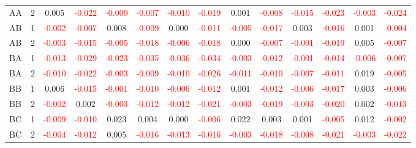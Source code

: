 \begin{table}[H]
{\begin{tabular}{llcccccccccccc}
AA & 2 & 0.005 & \textcolor{red}{-0.022} & \textcolor{red}{-0.009} & \textcolor{red}{-0.007} & \textcolor{red}{-0.010} & \textcolor{red}{-0.019} & 0.001 & \textcolor{red}{-0.008} & \textcolor{red}{-0.015} & \textcolor{red}{-0.023} & \textcolor{red}{-0.003} & \textcolor{red}{-0.024}\\
AB & 1 & \textcolor{red}{-0.002} & \textcolor{red}{-0.007} & 0.008 & \textcolor{red}{-0.009} & 0.000 & \textcolor{red}{-0.011} & \textcolor{red}{-0.005} & \textcolor{red}{-0.017} & 0.003 & \textcolor{red}{-0.016} & 0.001 & \textcolor{red}{-0.004}\\
AB & 2 & \textcolor{red}{-0.003} & \textcolor{red}{-0.015} & \textcolor{red}{-0.005} & \textcolor{red}{-0.018} & \textcolor{red}{-0.006} & \textcolor{red}{-0.018} & 0.000 & \textcolor{red}{-0.007} & \textcolor{red}{-0.001} & \textcolor{red}{-0.019} & 0.005 & \textcolor{red}{-0.007}\\
BA & 1 & \textcolor{red}{-0.013} & \textcolor{red}{-0.029} & \textcolor{red}{-0.023} & \textcolor{red}{-0.035} & \textcolor{red}{-0.036} & \textcolor{red}{-0.034} & \textcolor{red}{-0.003} & \textcolor{red}{-0.012} & \textcolor{red}{-0.001} & \textcolor{red}{-0.014} & \textcolor{red}{-0.006} & \textcolor{red}{-0.007}\\
BA & 2 & \textcolor{red}{-0.010} & \textcolor{red}{-0.022} & \textcolor{red}{-0.003} & \textcolor{red}{-0.009} & \textcolor{red}{-0.010} & \textcolor{red}{-0.026} & \textcolor{red}{-0.011} & \textcolor{red}{-0.010} & \textcolor{red}{-0.007} & \textcolor{red}{-0.011} & 0.019 & \textcolor{red}{-0.005}\\
BB & 1 & 0.006 & \textcolor{red}{-0.015} & \textcolor{red}{-0.001} & \textcolor{red}{-0.010} & \textcolor{red}{-0.006} & \textcolor{red}{-0.012} & 0.001 & \textcolor{red}{-0.012} & \textcolor{red}{-0.006} & \textcolor{red}{-0.017} & 0.003 & \textcolor{red}{-0.006}\\
BB & 2 & \textcolor{red}{-0.002} & 0.002 & \textcolor{red}{-0.003} & \textcolor{red}{-0.012} & \textcolor{red}{-0.012} & \textcolor{red}{-0.021} & \textcolor{red}{-0.003} & \textcolor{red}{-0.019} & \textcolor{red}{-0.003} & \textcolor{red}{-0.020} & 0.002 & \textcolor{red}{-0.013}\\
BC & 1 & \textcolor{red}{-0.009} & \textcolor{red}{-0.010} & 0.023 & 0.004 & 0.000 & \textcolor{red}{-0.006} & 0.022 & 0.003 & 0.001 & \textcolor{red}{-0.005} & 0.012 & \textcolor{red}{-0.002}\\
BC & 2 & \textcolor{red}{-0.004} & \textcolor{red}{-0.012} & 0.005 & \textcolor{red}{-0.016} & \textcolor{red}{-0.013} & \textcolor{red}{-0.016} & \textcolor{red}{-0.003} & \textcolor{red}{-0.018} & \textcolor{red}{-0.008} & \textcolor{red}{-0.021} & \textcolor{red}{-0.003} & \textcolor{red}{-0.022}\\
\hline
    \end{tabular}%
    }
    \label{tab:cen3_cov}
\end{table}

